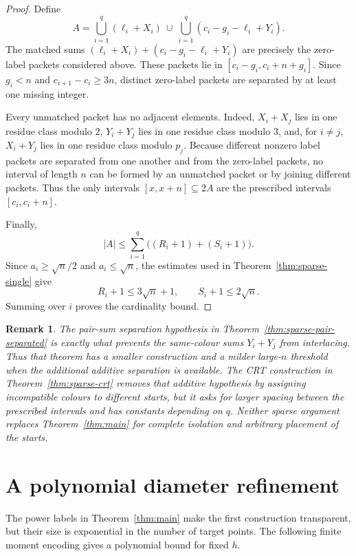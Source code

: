 \documentclass[11pt]{article}
\newtheorem{remark}{Remark}
\begin{document}
\begin{proof}
Define
\[
 A=\bigcup_{i=1}^q(\ell_i+X_i)
 \ \cup\
 \bigcup_{i=1}^q(c_i-g_i-\ell_i+Y_i).
\]
The matched sums $(\ell_i+X_i)+(c_i-g_i-\ell_i+Y_i)$ are precisely the
zero-label packets considered above. These packets lie in
$[c_i-g_i,c_i+n+g_i]$. Since $g_i<n$ and $c_{i+1}-c_i\geq3n$, distinct
zero-label packets are separated by at least one missing integer.

Every unmatched packet has no adjacent elements. Indeed, $X_i+X_j$ lies in
one residue class modulo $2$, $Y_i+Y_j$ lies in one residue class modulo $3$,
and, for $i\neq j$, $X_i+Y_j$ lies in one residue class modulo $p_j$.
Because different nonzero label packets are separated from one another and
from the zero-label packets, no interval of length $n$ can be formed by an
unmatched packet or by joining different packets. Thus the only intervals
$[x,x+n]\subseteq2A$ are the prescribed intervals $[c_i,c_i+n]$.

Finally,
\[
 |A|\leq\sum_{i=1}^q\bigl((R_i+1)+(S_i+1)\bigr).
\]
Since $a_i\geq\sqrt n/2$ and $a_i\leq\sqrt n$, the estimates used in
Theorem~\ref{thm:sparse-single} give
\[
 R_i+1\leq 3\sqrt n+1,\qquad S_i+1\leq2\sqrt n.
\]
Summing over $i$ proves the cardinality bound.
\end{proof}

\begin{remark}
The pair-sum separation hypothesis in Theorem~\ref{thm:sparse-pair-separated}
is exactly what prevents the same-colour sums $Y_i+Y_j$ from interlacing. Thus
that theorem has a smaller construction and a milder large-$n$ threshold when
the additional additive separation is available. The CRT construction in
Theorem~\ref{thm:sparse-crt} removes that additive hypothesis by assigning
incompatible colours to different starts, but it asks for larger spacing
between the prescribed intervals and has constants depending on $q$. Neither
sparse argument replaces Theorem~\ref{thm:main} for complete isolation and
arbitrary placement of the starts.
\end{remark}

\section{A polynomial diameter refinement}

The power labels in Theorem~\ref{thm:main} make the first construction
transparent, but their size is exponential in the number of target points.
The following finite moment encoding gives a polynomial bound for fixed $h$.
\end{document}
